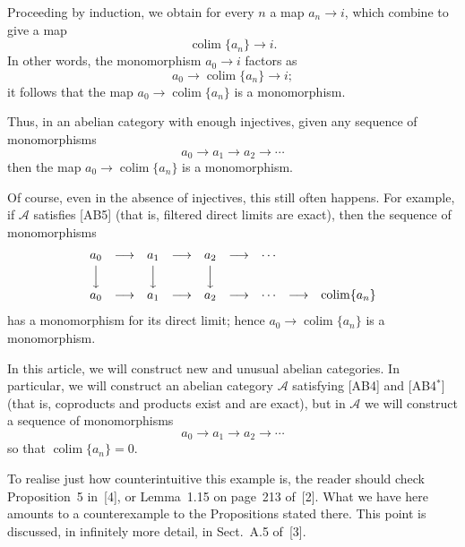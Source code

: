 \documentclass[11pt,a4paper]{article}
\theoremstyle{plain}
\theoremstyle{definition}
\DeclareMathOperator{\colim}{colim}
\numberwithin{equation}{section}
\begin{document}
Proceeding by induction, we obtain for every $n$ a map $a_{n} \to i$, which combine to give a map
\begin{equation*}
\colim\{a_{n}\} \longrightarrow i.
\end{equation*}
In other words, the monomorphism $a_{0} \to i$ factors as
\begin{equation*}
a_{0} \longrightarrow \colim\{a_{n}\} \longrightarrow i;
\end{equation*}
it follows that the map $a_{0} \to \colim\{a_{n}\}$ is a monomorphism.

Thus, in an abelian category with enough injectives, given any sequence of monomorphisms
\begin{equation*}
a_{0} \longrightarrow a_{1} \longrightarrow a_{2} \longrightarrow \cdots
\end{equation*}
then the map $a_{0} \to \colim\{a_{n}\}$ is a monomorphism.

Of course, even in the absence of injectives, this still often happens. For example, if $\mathcal{A}$ satisfies [AB5] (that is, filtered direct limits are exact), then the sequence of monomorphisms
\begin{equation*}
\begin{array}{ccccccccc}
a_{0} & \longrightarrow & a_{1} & \longrightarrow & a_{2} & \longrightarrow & \cdots \\[2pt]
\Big\downarrow & & \Big\downarrow & & \Big\downarrow \\[2pt]
a_{0} & \longrightarrow & a_{1} & \longrightarrow & a_{2} & \longrightarrow & \cdots & \longrightarrow & \colim\{a_{n}\}
\end{array}
\end{equation*}
has a monomorphism for its direct limit; hence $a_{0} \to \colim\{a_{n}\}$ is a monomorphism.

In this article, we will construct new and unusual abelian categories. In particular, we will construct an abelian category $\mathcal{A}$ satisfying [AB4] and [AB4$^{*}$] (that is, coproducts and products exist and are exact), but in $\mathcal{A}$ we will construct a sequence of monomorphisms
\begin{equation*}
a_{0} \longrightarrow a_{1} \longrightarrow a_{2} \longrightarrow \cdots
\end{equation*}
so that $\colim\{a_{n}\} = 0$.

To realise just how counterintuitive this example is, the reader should check Proposition~5 in~[4], or Lemma~1.15 on page~213 of~[2]. What we have here amounts to a counterexample to the Propositions stated there. This point is discussed, in infinitely more detail, in Sect.~A.5 of~[3].
\end{document}
